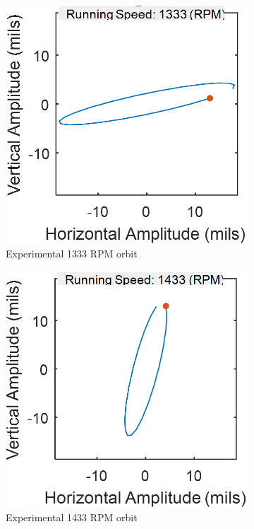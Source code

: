 		\begin{figure}[H]
			\begin{subfigure}[b]{.5\linewidth}	
				\centering
				\includegraphics[width=.75\textwidth]{./figures/Images/Figure_16a}
				\caption{Experimental 1333 RPM orbit}
				\label{fig:Figure_16a}
			\end{subfigure}
			\begin{subfigure}[b]{.5\linewidth}
				\centering
				\includegraphics[width=.75\textwidth]{./figures/Images/Figure_16b}
				\caption{Experimental 1433 RPM orbit}
				\label{fig:Figure_16b}
			\end{subfigure}
			\begin{subfigure}[b]{.5\linewidth}
				\centering

\end{subfigure}
\end{figure}
